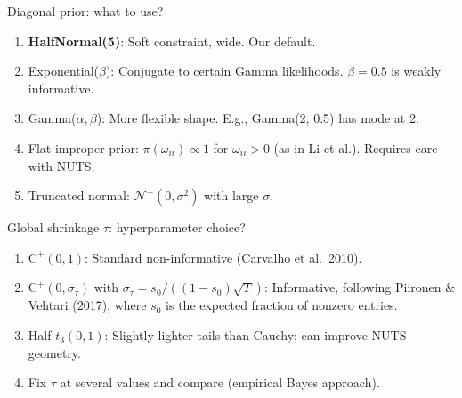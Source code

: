 \documentclass[11pt,a4paper]{article}
\newcommand{\Normal}{\mathcal{N}}
\newcommand{\HalfCauchy}{\mathrm{C}^{+}}
\begin{document}
\begin{decision}{Diagonal prior: what to use?}
\begin{enumerate}[nosep]
  \item[\textbf{(a)}] \textbf{HalfNormal(5)}: Soft constraint, wide. Our default.
  \item[(b)] Exponential($\beta$): Conjugate to certain Gamma likelihoods. $\beta = 0.5$ is weakly informative.
  \item[(c)] Gamma($\alpha, \beta$): More flexible shape. E.g., Gamma(2, 0.5) has mode at 2.
  \item[(d)] Flat improper prior: $\pi(\omega_{ii}) \propto 1$ for $\omega_{ii} > 0$ (as in Li et al.). Requires care with NUTS.
  \item[(e)] Truncated normal: $\Normal^+(0, \sigma^2)$ with large $\sigma$.
\end{enumerate}
\end{decision}

\begin{decision}{Global shrinkage $\tau$: hyperparameter choice?}
\begin{enumerate}[nosep]
  \item[\textbf{(a)}] \textbf{$\HalfCauchy(0, 1)$}: Standard non-informative (Carvalho et al.\ 2010).
  \item[(b)] $\HalfCauchy(0, \sigma_\tau)$ with $\sigma_\tau = s_0 / ((1 - s_0)\sqrt{T})$: Informative, following Piironen \& Vehtari (2017), where $s_0$ is the expected fraction of nonzero entries.
  \item[(c)] Half-$t_3(0, 1)$: Slightly lighter tails than Cauchy; can improve NUTS geometry.
  \item[(d)] Fix $\tau$ at several values and compare (empirical Bayes approach).
\end{enumerate}
\end{decision}
\end{document}
